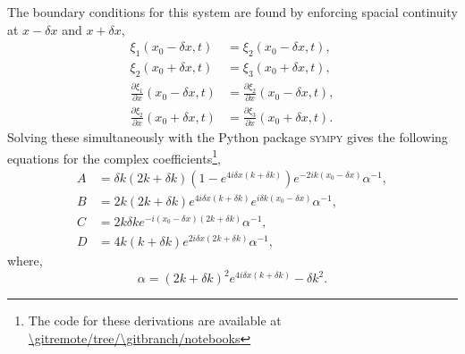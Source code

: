 The boundary conditions for this system are found by enforcing spacial continuity at \(x - \delta x\) and \(x + \delta x\),
%
\begin{align*}
    \xi_1(x_0 - \delta x, t) &= \xi_2(x_0 - \delta x, t), \\
    \xi_2(x_0 + \delta x, t) &= \xi_3(x_0 + \delta x, t), \\
    \frac{\partial \xi_1}{\partial x}(x_0 - \delta x, t) &= \frac{\partial \xi_2}{\partial x}(x_0 - \delta x, t), \\
    \frac{\partial \xi_2}{\partial x}(x_0 + \delta x, t) &= \frac{\partial \xi_3}{\partial x}(x_0 + \delta x, t).
\end{align*}
%
Solving these simultaneously with the Python package \textsc{sympy} gives the following equations for the complex coefficients\footnote{The code for these derivations are available at \url{\gitremote/tree/\gitbranch/notebooks}},
%
\begin{align}
    A &= \delta k (2k + \delta k) (1 - e^{4i \delta x (k + \delta k)}) e^{- 2i k (x_0 - \delta x)} \alpha^{-1}, \\
    B &= 2 k (2k + \delta k) e^{4i \delta x (k + \delta k)} e^{i \delta k (x_0 - \delta x)} \alpha^{-1}, \\
    C &= 2 k \delta k e^{- i (x_0 - \delta x) (2k + \delta k)} \alpha^{-1}, \\
    D &= 4 k (k + \delta k) e^{2 i \delta x (2k + \delta k)} \alpha^{-1},
\end{align}
%
where,
\begin{equation}
    \alpha = (2k + \delta k)^2 e^{4 i \delta x (k + \delta k)} - \delta k^2.
\end{equation}
%

